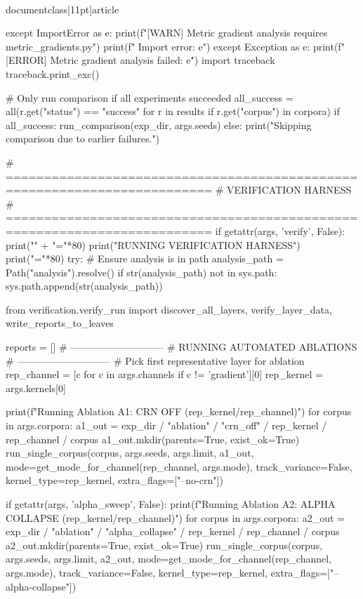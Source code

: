 \\documentclass[11pt]{article}
\begin{document}
\begin{CodeBlock}
        except ImportError as e:
            print(f"[WARN] Metric gradient analysis requires metric_gradients.py")
            print(f"  Import error: {e}")
        except Exception as e:
            print(f"[ERROR] Metric gradient analysis failed: {e}")
            import traceback
            traceback.print_exc()

    # Only run comparison if all experiments succeeded
    all_success = all(r.get("status") == "success" for r in results if r.get("corpus") in corpora)
    if all_success:
        run_comparison(exp_dir, args.seeds)
    else:
        print("\n[WARN] Skipping comparison due to earlier failures.")

    
    # =========================================================================
    # VERIFICATION HARNESS
    # =========================================================================
    if getattr(args, 'verify', False):
        print("\n" + "="*80)
        print("RUNNING VERIFICATION HARNESS")
        print("="*80)
        try:
            # Ensure analysis is in path
            analysis_path = Path("analysis").resolve()
            if str(analysis_path) not in sys.path:
                sys.path.append(str(analysis_path))
            
            from verification.verify_run import discover_all_layers, verify_layer_data, write_reports_to_leaves
            
            reports = []
            # -----------------------------
            # RUNNING AUTOMATED ABLATIONS
            # -----------------------------
            # Pick first representative layer for ablation
            rep_channel = [c for c in args.channels if c != 'gradient'][0]
            rep_kernel = args.kernels[0]
            
            print(f"\n[VERIFY] Running Ablation A1: CRN OFF ({rep_kernel}/{rep_channel})")
            for corpus in args.corpora:
                a1_out = exp_dir / "ablation" / "crn_off" / rep_kernel / rep_channel / corpus
                a1_out.mkdir(parents=True, exist_ok=True)
                run_single_corpus(corpus, args.seeds, args.limit, a1_out, 
                                 mode=get_mode_for_channel(rep_channel, args.mode), 
                                 track_variance=False, kernel_type=rep_kernel,
                                 extra_flags=["--no-crn"])
            
            if getattr(args, 'alpha_sweep', False):
                print(f"\n[VERIFY] Running Ablation A2: ALPHA COLLAPSE ({rep_kernel}/{rep_channel})")
                for corpus in args.corpora:
                    a2_out = exp_dir / "ablation" / "alpha_collapse" / rep_kernel / rep_channel / corpus
                    a2_out.mkdir(parents=True, exist_ok=True)
                    run_single_corpus(corpus, args.seeds, args.limit, a2_out, 
                                     mode=get_mode_for_channel(rep_channel, args.mode), 
                                     track_variance=False, kernel_type=rep_kernel,
                                     extra_flags=["--alpha-collapse"])


\end{CodeBlock}
\end{document}
